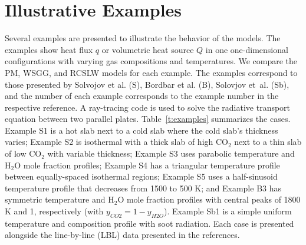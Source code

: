 \documentclass[preprint,12pt, a4paper]{elsarticle}
\begin{document}

\section{Illustrative Examples} \label{s:Examples}

Several examples are presented to illustrate the behavior of the models. The examples show heat flux $q$ or volumetric heat source $Q$ in one one-dimensional configurations with varying gas compositions and temperatures. We compare the PM, WSGG, and RCSLW models for each example. The examples correspond to those presented by Solvojov et al. \cite{Solovjov_2017} (S), Bordbar et al. \cite{Bordbar_2020} (B), Solovjov et~al. \cite{Solovjov_2001} (Sb), and the number of each example corresponds to the example number in the respective reference. A ray-tracing code is used to solve the radiative transport equation between two parallel plates. 
Table~\ref{t:examples} summarizes the cases. Example S1 is a hot slab next to a cold slab where the cold slab's thickness varies; Example S2 is isothermal with a thick slab of high CO$_2$ next to a thin slab of low CO$_2$ with variable thickness; Example S3 uses parabolic temperature and H$_2$O mole fraction profiles; Example S4 has a triangular temperature profile between equally-spaced isothermal regions; Example S5 uses a half-sinusoid temperature profile that decreases from 1500 to 500 K; and Example B3 has symmetric temperature and H$_2$O mole fraction profiles with central peaks of 1800 K and 1, respectively (with $y_{CO2}=1-y_{H2O}$). Example Sb1 is a simple uniform temperature and composition profile with soot radiation. Each case is presented alongside the line-by-line (LBL) data presented in the references. 
%
\end{document}
